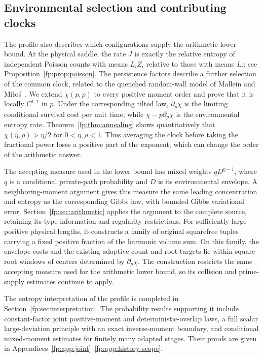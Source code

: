 \subsection{Environmental selection and contributing clocks}

The profile also describes which configurations supply the arithmetic
lower bound. At the physical saddle, the rate $J$ is exactly the relative
entropy of independent Poisson counts with means $L_iZ_i$ relative to
those with means $L_i$; see Proposition~\ref{fp:prop:poisson}.
The persistence factors describe a further selection of the common
clock, related to the quenched random-wall model of Mallein and
Mi\l o\'s~\cite{MalleinMilos2018}. We extend $\chi(p,\rho)$ to every positive moment order and prove
that it is locally $C^{1,1}$ in $p$. Under the corresponding tilted law,
$\partial_p\chi$ is the limiting conditional survival cost per unit
time, while $\chi-p\partial_p\chi$ is the environmental entropy rate.
Theorem~\ref{fp:thm:annealing} shows quantitatively that
$\chi(\eta,\rho)>\eta/2$ for $0<\eta,\rho<1$. Thus averaging the
clock before taking the fractional power loses a positive part of the
exponent, which can change the order of the arithmetic answer.

The accepting measure used in the lower bound has mixed weights
$qD^{\eta-1}$, where $q$ is a conditional private-path probability and
$D$ is its environmental envelope. A neighboring-moment argument gives
this measure the same leading concentration and entropy as the
corresponding Gibbs law, with bounded Gibbs variational error.
Section~\ref{fp:sec:arithmetic} applies the argument to the complete
source, retaining its type information and regularity restrictions.
For sufficiently large positive physical lengths, it constructs a
family of original squarefree tuples carrying a fixed positive fraction
of the harmonic volume sum. On this family, the envelope costs and the
existing adaptive count and root targets lie within square-root windows
of centers determined by $\partial_p\chi$. The construction restricts
the same accepting measure used for the arithmetic lower bound, so its
collision and prime-supply estimates continue to apply.

The entropy interpretation of the profile is completed in
Section~\ref{fp:sec:interpretation}. The probability results supporting
it include constant-factor joint positive-moment and deterministic-overlap
laws, a full scalar large-deviation principle with an exact inverse-moment
boundary, and conditional mixed-moment estimates for finitely many
adapted stages. Their proofs are given in
Appendices~\ref{fp:app:joint}--\ref{fp:app:history-scope}.


